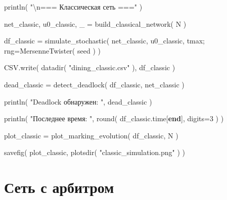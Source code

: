 \documentclass[
  english,
  russian,
  12pt,
  a4paper,
  DIV=11,
  numbers=noendperiod]{scrreprt}
\newenvironment{Shaded}{\begin{snugshade}}{\end{snugshade}}
\newcommand{\FloatTok}[1]{\textcolor[rgb]{0.68,0.00,0.00}{#1}}
\newcommand{\FunctionTok}[1]{\textcolor[rgb]{0.28,0.35,0.67}{#1}}
\newcommand{\KeywordTok}[1]{\textcolor[rgb]{0.00,0.23,0.31}{\textbf{#1}}}
\newcommand{\NormalTok}[1]{\textcolor[rgb]{0.00,0.23,0.31}{#1}}
\newcommand{\OperatorTok}[1]{\textcolor[rgb]{0.37,0.37,0.37}{#1}}
\newcommand{\SpecialCharTok}[1]{\textcolor[rgb]{0.37,0.37,0.37}{#1}}
\newcommand{\StringTok}[1]{\textcolor[rgb]{0.13,0.47,0.30}{#1}}
\begin{document}
\begin{Shaded}
\begin{Highlighting}[]
\FunctionTok{println}\NormalTok{(}
    \StringTok{"}\SpecialCharTok{\textbackslash{}n}\StringTok{=== Классическая сеть ==="}
\NormalTok{)}

\NormalTok{net\_classic,}
\NormalTok{u0\_classic,}
\NormalTok{\_ }\OperatorTok{=}
    \FunctionTok{build\_classical\_network}\NormalTok{(}
\NormalTok{        N}
\NormalTok{    )}

\NormalTok{df\_classic }\OperatorTok{=}
    \FunctionTok{simulate\_stochastic}\NormalTok{(}
\NormalTok{        net\_classic,}
\NormalTok{        u0\_classic,}
\NormalTok{        tmax;}
\NormalTok{        rng}\OperatorTok{=}\FunctionTok{MersenneTwister}\NormalTok{(}
\NormalTok{            seed}
\NormalTok{        )}
\NormalTok{    )}

\NormalTok{CSV.}\FunctionTok{write}\NormalTok{(}
    \FunctionTok{datadir}\NormalTok{(}
        \StringTok{"dining\_classic.csv"}
\NormalTok{    ),}
\NormalTok{    df\_classic}
\NormalTok{)}

\NormalTok{dead\_classic }\OperatorTok{=}
    \FunctionTok{detect\_deadlock}\NormalTok{(}
\NormalTok{        df\_classic,}
\NormalTok{        net\_classic}
\NormalTok{    )}

\FunctionTok{println}\NormalTok{(}
    \StringTok{"Deadlock обнаружен: "}\NormalTok{,}
\NormalTok{    dead\_classic}
\NormalTok{)}

\FunctionTok{println}\NormalTok{(}
    \StringTok{"Последнее время: "}\NormalTok{,}
    \FunctionTok{round}\NormalTok{(}
\NormalTok{        df\_classic.time[}\KeywordTok{end}\NormalTok{],}
\NormalTok{        digits}\OperatorTok{=}\FloatTok{3}
\NormalTok{    )}
\NormalTok{)}

\NormalTok{plot\_classic }\OperatorTok{=}
    \FunctionTok{plot\_marking\_evolution}\NormalTok{(}
\NormalTok{        df\_classic,}
\NormalTok{        N}
\NormalTok{    )}

\FunctionTok{savefig}\NormalTok{(}
\NormalTok{    plot\_classic,}
    \FunctionTok{plotsdir}\NormalTok{(}
        \StringTok{"classic\_simulation.png"}
\NormalTok{    )}
\NormalTok{)}
\end{Highlighting}
\end{Shaded}

\section{Сеть с
арбитром}\label{ux441ux435ux442ux44c-ux441-ux430ux440ux431ux438ux442ux440ux43eux43c}
\end{document}
